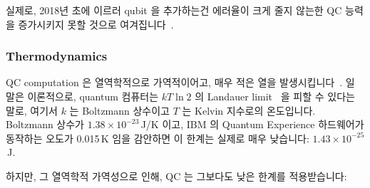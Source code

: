 실제로, 2018년 초에 이르러 qubit 을 추가하는건 에러율이 크게 줄지 않는한 QC
능력을 증가시키지 못할 것으로 여겨집니다~\cite{IBMResearch2018QuantumVolume}.

\subsubsection{Thermodynamics}
\label{sec:future:Thermodynamics}

QC computation 은 열역학적으로 가역적이어고, 매우 적은 열을
발생시킵니다~\cite{Bennett:1973:LRC:1664562.1664568,RichardFeynman1986QuantumMechanicalComputers}.
일 말은 이론적으로, quantum 컴퓨터는 $kT \ln 2$ 의 Landauer
limit~\cite{Landauer:1961:IHG:1661184.1661186} 을 피할 수 있다는 말로, 여기서
$k$ 는 Boltzmann 상수이고 $T$ 는 Kelvin 지수로의 온도입니다.
Boltzmann 상수가 $1.38 \times 10^{-23}$\,J/K 이고, IBM 의 Quantum Experience
하드웨어가 동작하는 오도가 0.015\,K 임을 감안하면 이 한계는 실제로 매우
낮습니다: $1.43 \times 10^{-25}$\,J.

하지만, 그 열역학적 가역성으로 인해, QC 는 그보다도 낮은 한계를 적용받습니다:
\iffalse

